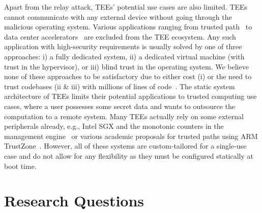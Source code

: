 Apart from the relay attack, TEEs' potential use cases are also limited.  TEEs cannot communicate with any external device without going through the malicious operating system. Various applications ranging from trusted path~\cite{zhou2012building,Fidelius,protection} to data center accelerators~\cite{volos2018graviton} are excluded from the TEE ecosystem. Any such application with high-security requirements is usually solved by one of three approaches: i) a fully dedicated system, ii) a dedicated virtual machine (with trust in the hypervisor), or iii) blind trust in the operating system. We believe none of these approaches to be satisfactory due to either cost (i) or the need to trust codebases (ii \& iii) with millions of lines of code~\cite{torvalds2020linux,barham2003xen}.
The static system architecture of TEEs limits their potential applications to trusted computing use cases, where a user possesses some secret data and wants to outsource the computation to a remote system. Many TEEs actually rely on some external peripherals already, e.g., Intel SGX and the monotonic counters in the management engine~\cite{matetic2017rote} or various academic proposals for trusted paths using ARM TrustZone~\cite{SeCloak,VButton}. However, all of these systems are custom-tailored for a single-use case and do not allow for any flexibility as they must be configured statically at boot time.


\section{Research Questions}

